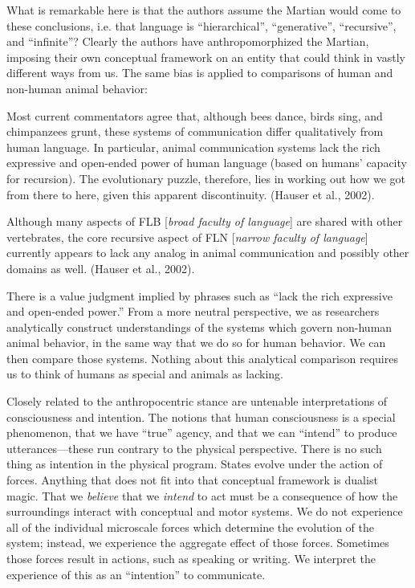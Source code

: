   What is remarkable here is that the authors assume the Martian would come to these conclusions, i.e. that language is “hierarchical”, “generative”, “recursive”, and “infinite”? Clearly the authors have anthropomorphized the Martian, imposing their own conceptual framework on an entity that could think in vastly different ways from us. The same bias is applied to comparisons of human and non-human animal behavior:

Most current commentators agree that, although bees dance, birds sing, and chimpanzees grunt, these systems of communication differ qualitatively from human language. In particular, animal communication systems lack the rich expressive and open-ended power of human language (based on humans' capacity for recursion). The evolutionary puzzle, therefore, lies in working out how we got from there to here, given this apparent discontinuity. (Hauser et al., 2002).

Although many aspects of FLB [\textit{broad faculty of language}] are shared with other vertebrates, the core recursive aspect of FLN [\textit{narrow faculty of language}] currently appears to lack any analog in animal communication and possibly other domains as well. (Hauser et al., 2002).

  There is a value judgment implied by phrases such as “lack the rich expressive and open-ended power.” From a more neutral perspective, we as researchers analytically construct understandings of the systems which govern non-human animal behavior, in the same way that we do so for human behavior. We can then compare those systems. Nothing about this analytical comparison requires us to think of humans as special and animals as lacking.

  Closely related to the anthropocentric stance are untenable interpretations of consciousness and intention. The notions that human consciousness is a special phenomenon, that we have “true” agency, and that we can “intend” to produce utterances—these run contrary to the physical perspective. There is no such thing as intention in the physical program. States evolve under the action of forces. Anything that does not fit into that conceptual framework is dualist magic. That we \textit{believe} that we \textit{intend} to act must be a consequence of how the surroundings interact with conceptual and motor systems. We do not experience all of the individual microscale forces which determine the evolution of the system; instead, we experience the aggregate effect of those forces.  Sometimes those forces result in actions, such as speaking or writing. We interpret the experience of this as an “intention” to communicate.

